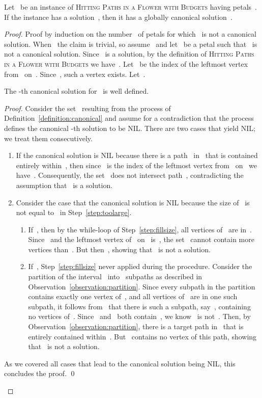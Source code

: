 \let\accentvec\vec  \documentclass{llncs}
\newcommand{\claimqed}{\renewcommand{\squareforqed}{}\qed\renewcommand{\squareforqed}{\plainsquareforqed}}
\newcommand{\HitPathsInFlower}{\textsc{Hitting Paths in a Flower with Budgets}\xspace}
\begin{document}
\begin{lemma} \label{lemma:existscanonical}
Let~ be an instance of \HitPathsInFlower having petals~. If the instance has a solution~, then it has a globally canonical solution~. \end{lemma}
\begin{proof}
Proof by induction on the number~ of petals for which~ is not a canonical solution. When~ the claim is trivial, so assume~ and let~ be a petal such that~ is not a canonical solution. Since~ is a solution, by the definition of \HitPathsInFlower we have~. Let~ be the index of the leftmost vertex from~ on~. Since~, such a vertex exists. Let~.

\begin{claim}
The -th canonical solution for~ is well defined.
\end{claim}
\begin{proof}
Consider the set~ resulting from the process of Definition~\ref{definition:canonical} and assume for a contradiction that the process defines the canonical -th solution to be NIL. There are two cases that yield NIL; we treat them consecutively.
\begin{enumerate}
	\item If the canonical solution is NIL because there is a path~ in~ that is contained entirely within~, then since~ is the index of the leftmost vertex from~ on~ we have~. Consequently, the set~ does not intersect path~, contradicting the assumption that~ is a solution.
	\item Consider the case that the canonical solution is NIL because the size of~ is not equal to~ in Step~\ref{step:toolarge}.
	\begin{enumerate}
		\item If~, then by the while-loop of Step~\ref{step:fillsize}, all vertices of~ are in~. Since~ and the leftmost vertex of~ on~ is~, the set~ cannot contain more vertices than~. But then~, showing that~ is not a solution.
		\item If~, Step~\ref{step:fillsize} never applied during the procedure. Consider the partition of the interval~ into~ subpaths as described in Observation~\ref{observation:partition}. Since every subpath in the partition contains exactly one vertex of~, and all vertices of~ are in one such subpath, it follows from~ that there is such a subpath, say~, containing no vertices of~. Since~ and~ both contain~, we know~ is not~. Then, by Observation~\ref{observation:partition}, there is a target path in~ that is entirely contained within~. But~ contains no vertex of this path, showing that~ is not a solution.
	\end{enumerate}
\end{enumerate}
As we covered all cases that lead to the canonical solution being NIL, this concludes the proof.
\claimqed
\end{proof}


\end{proof}
\end{document}
